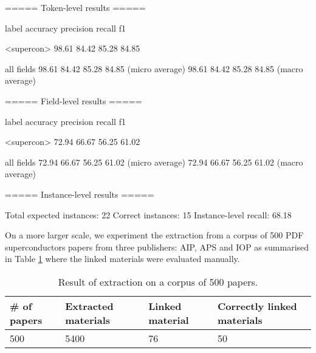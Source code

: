 \documentclass{article}
\begin{document}
\begin{verbnobox}[\small]

===== Token-level results =====

label                accuracy     precision    recall       f1     

<supercon>           98.61        84.42        85.28        84.85  

all fields           98.61        84.42        85.28        84.85   (micro average)
                     98.61        84.42        85.28        84.85   (macro average)

===== Field-level results =====

label                accuracy     precision    recall       f1     

<supercon>           72.94        66.67        56.25        61.02  

all fields           72.94        66.67        56.25        61.02   (micro average)
                     72.94        66.67        56.25        61.02   (macro average)

===== Instance-level results =====

Total expected instances:   22
Correct instances:          15
Instance-level recall:      68.18
\end{verbnobox}

On a more larger scale, we experiment the extraction from a corpus of 500 PDF superconductors papers from three publishers: AIP, APS and IOP as summarised in Table \ref{table:result-extraction} where the linked materials were evaluated manually. 

\begin{table}[h!]
    \centering
    \begin{tabular}{ | m{6em} | m{6em} | m{6em} | m{6em} | } 
    \hline
        \# of papers & Extracted materials & Linked material & Correctly linked materials  \\
    \hline
        500 & 5400 & 76 & 50 \\ 
    \hline
    \end{tabular}
    \label{table:result-extraction}
    \caption{Result of extraction on a corpus of 500 papers.}    
\end{table}
\end{document}
